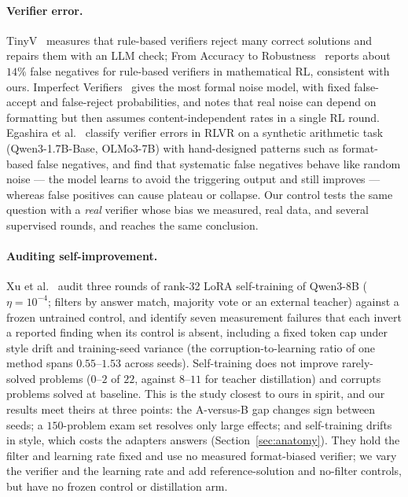 \documentclass[runningheads]{llncs}
\begin{document}
\paragraph{Verifier error.}
TinyV~\cite{ref_tinyv} measures that rule-based verifiers reject many correct
solutions and repairs them with an LLM check; From Accuracy to
Robustness~\cite{ref_robustness} reports about $14\%$ false negatives for
rule-based verifiers in mathematical RL, consistent with ours. Imperfect
Verifiers~\cite{ref_imperfect} gives the most formal noise model, with fixed
false-accept and false-reject probabilities, and notes that real noise can depend
on formatting but then assumes content-independent rates in a single RL round.
Egashira et al.~\cite{ref_delayplateau} classify verifier errors in RLVR on a
synthetic arithmetic task (Qwen3-1.7B-Base, OLMo3-7B) with hand-designed patterns
such as format-based false negatives, and find that systematic false negatives
behave like random noise --- the model learns to avoid the triggering output and
still improves --- whereas false positives can cause plateau or collapse. Our
control tests the same question with a \emph{real} verifier whose bias we
measured, real data, and several supervised rounds, and reaches the same
conclusion.

\paragraph{Auditing self-improvement.}
Xu et al.~\cite{ref_phantom} audit three rounds of rank-32 LoRA self-training of
Qwen3-8B ($\eta=10^{-4}$; filters by answer match, majority vote or an external
teacher) against a frozen untrained control, and identify seven measurement
failures that each invert a reported finding when its control is absent,
including a fixed token cap under style drift and training-seed variance (the
corruption-to-learning ratio of one method spans $0.55$--$1.53$ across seeds).
Self-training does not improve rarely-solved problems ($0$--$2$ of $22$, against
$8$--$11$ for teacher distillation) and corrupts problems solved at baseline. This
is the study closest to ours in spirit, and our results meet theirs at three
points: the A-versus-B gap changes sign between seeds; a $150$-problem exam set
resolves only large effects; and self-training drifts in style, which costs the
adapters answers (Section~\ref{sec:anatomy}). They hold the filter
and learning rate fixed and use no measured format-biased verifier; we vary the
verifier and the learning rate and add reference-solution and no-filter controls,
but have no frozen control or distillation arm.
\end{document}
